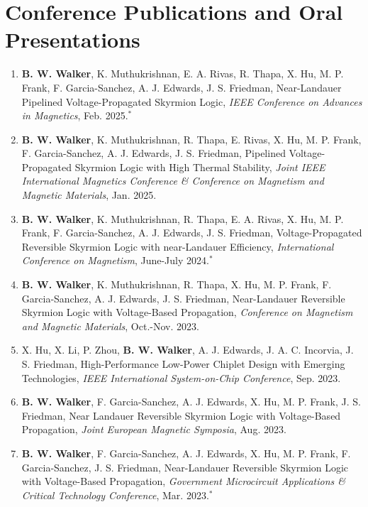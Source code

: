 \documentclass[letterpaper,11pt]{article}
\begin{document}
\section{Conference Publications and Oral Presentations}
    \begin{itemize}[leftmargin=0.15in, label={}]
        \small{\item{
        \begin{enumerate}[leftmargin=0.15in]
          \item \small{\textbf{B. W. Walker}, K. Muthukrishnan, E. A. Rivas, R. Thapa, X. Hu, M. P. Frank, F. Garcia-Sanchez, A. J. Edwards, J. S. Friedman, Near-Landauer Pipelined Voltage-Propagated Skyrmion Logic, \textit{IEEE Conference on Advances in Magnetics}, Feb. 2025.$^{*}$}
          \item \small{\textbf{B. W. Walker}, K. Muthukrishnan, R. Thapa, E. Rivas, X. Hu, M. P. Frank, F. Garcia-Sanchez, A. J. Edwards, J. S. Friedman, Pipelined Voltage-Propagated Skyrmion Logic with High Thermal Stability, \textit{Joint IEEE International Magnetics Conference \& Conference on Magnetism and Magnetic Materials}, Jan. 2025.}
          \item \small{\textbf{B. W. Walker}, K. Muthukrishnan, R. Thapa, E. A. Rivas, X. Hu, M. P. Frank, F. Garcia-Sanchez, A. J. Edwards, J. S. Friedman, Voltage-Propagated Reversible Skyrmion Logic with near-Landauer Efficiency, \textit{International Conference on Magnetism}, June-July 2024.$^{*}$}
          \item \small{\textbf{B. W. Walker}, K. Muthukrishnan, R. Thapa, X. Hu, M. P. Frank, F. Garcia-Sanchez, A. J. Edwards, J. S. Friedman, Near-Landauer Reversible Skyrmion Logic with Voltage-Based Propagation, \textit{Conference on Magnetism and Magnetic Materials}, Oct.-Nov. 2023.}
          \item \small{X. Hu, X. Li, P. Zhou, \textbf{B. W. Walker}, A. J. Edwards, J. A. C. Incorvia, J. S. Friedman, High-Performance Low-Power Chiplet Design with Emerging Technologies, \textit{IEEE International System-on-Chip Conference}, Sep. 2023.}
          \item \small{\textbf{B. W. Walker}, F. Garcia-Sanchez, A. J. Edwards, X. Hu, M. P. Frank, J. S. Friedman, Near Landauer Reversible Skyrmion Logic with Voltage-Based Propagation, \textit{Joint European Magnetic Symposia}, Aug. 2023.}
          \item \small{\textbf{B. W. Walker}, F. Garcia-Sanchez, A. J. Edwards, X. Hu, M. P. Frank, F. Garcia-Sanchez, J. S. Friedman, Near-Landauer Reversible Skyrmion Logic with Voltage-Based Propagation, \textit{Government Microcircuit Applications \& Critical Technology Conference}, Mar. 2023.$^{*}$}

\end{enumerate}}}
\end{itemize}
\end{document}
